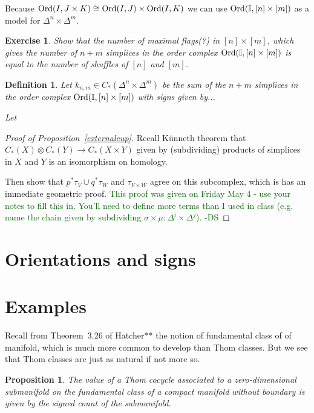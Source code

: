 \documentclass{amsart}          %
\newtheorem{proposition}[theorem]{Proposition}
\newtheorem{definition}[theorem]{Definition}
\newtheorem{exercise}[theorem]{Exercise}
\newcommand{\forclass}[1]{\textcolor{darkgreen}{#1 -DS}}
\newcommand{\I}{\mathbb I}
\begin{document}
Because ${\rm Ord}(I,J \times K) \cong {\rm Ord}(I,J) \times {\rm Ord}(I,K)$ we can use ${\rm Ord}(\I,[n] \times [m])$
as a model for $\Delta^n \times \Delta^m$.   

\begin{exercise}
Show that the number of maximal flags(?) in $[n] \times [m]$, which gives the number of
$n + m$ simplices in the order complex ${\rm Ord}(\I, [n] \times [m])$ is equal to the number of shuffles of $[n]$ and $[m]$.
\end{exercise}

\begin{definition}
Let $k_{n,m} \in C_*(\Delta^n \times \Delta^m)$ be the sum of the $n + m$ simplices in the order complex ${\rm Ord}(\I, [n] \times [m])$
with signs given by...  

Let 
\end{definition}


\begin{proof}[Proof of Proposition~\ref{externalcup}]
Recall K\"unneth theorem that  $C_*(X) \otimes C_*(Y) \to C_*(X \times Y)$ given by (subdividing) products of simplices in $X$ and $Y$ is an
isomorphism on homology.  

Then show that $p^* \tau_V \cup q^* \tau_W$ and $\tau_{V \times W}$ agree on this subcomplex, which is has an immediate
geometric proof.  \forclass{This proof was given on Friday May 4 - use your notes to fill this in.  You'll need to define more terms than
I used in class (e.g. name the chain given by subdividing $\sigma \times \mu : \Delta^i \times \Delta^j$).}
\end{proof}

\section{Orientations and signs}

\section{Examples}

Recall from Theorem~3.26 of Hatcher** the notion of fundamental class of of manifold, which  is much more common to 
develop than Thom classes.  
But we see that Thom classes are just as natural if not more so.


\begin{proposition}\label{top_cohomology}
The value of a Thom cocycle associated to a zero-dimensional submanifold on the fundamental class of a compact manifold without
boundary  is given by 
the signed count of the submanifold.
\end{proposition}
\end{document}
